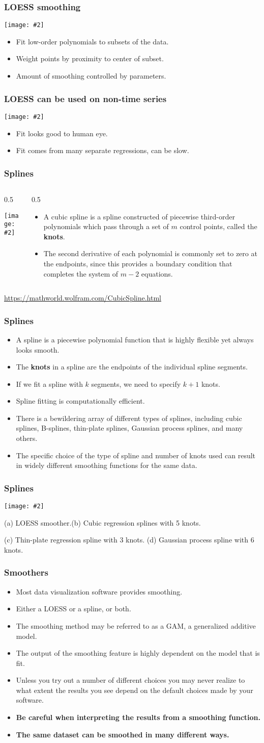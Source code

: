 \documentclass{beamer}
\newcommand{\bi}{\begin{itemize}}
\newcommand{\li}{\item}
\newcommand{\ei}{\end{itemize}}
\newcommand{\fig}[2]{\centerline{\texttt{[image: \#2]}}}
\newcommand{\bfr}[1]{\begin{frame}[fragile]\frametitle{{ #1 }}}
\newcommand{\cola}[1]{\begin{columns}\begin{column}{#1\textwidth}}
\newcommand{\colb}[1]{\end{column}\begin{column}{#1\textwidth}}
\newcommand{\colc}{\end{column}\end{columns}}
\begin{document}
\bfr{LOESS smoothing}
\fig{1}{dow-jones-loess-1.png}
\bi
\li Fit low-order polynomials to subsets of the data.
\li Weight points by proximity to center of subset.
\li Amount of smoothing controlled by parameters.
\ei
\end{frame}

\bfr{LOESS can be used on non-time series}
\fig{.8}{tank-capacity-loess-1.png}
\bi
\li Fit looks good to human eye.
\li Fit comes from many separate regressions, can be slow.
\ei
\end{frame}

\bfr{Splines}
\cola{0.5}
\fig{1}{CubicSpline_700.png}
\colb{0.5}
\bi
\li
A cubic spline is a spline constructed of piecewise third-order polynomials which pass through a set of $m$ control points, called the {\bf knots}.
\li The second derivative of each polynomial is commonly set to zero at the endpoints, since this provides a boundary condition that completes the system of $m-2$ equations. 
\ei
\colc
\vfill
\tiny
\url{https://mathworld.wolfram.com/CubicSpline.html}
\end{frame}

\bfr{Splines}
\bi
\li  A spline is a piecewise polynomial function that is highly flexible yet always looks smooth.
\li The {\bf knots} in a spline are the endpoints of the individual spline segments.
\li If we fit a spline with $k$ segments, we need to specify $k+1$ knots.
\li Spline fitting is computationally efficient. 
\li There is a bewildering array of different types of splines, including
cubic splines, B-splines,  thin-plate splines,  Gaussian process splines, and many others. 
\li The specific choice of the type of spline and number of knots used can result in widely different smoothing functions for the same data.
\ei
\end{frame}



\bfr{Splines}
\fig{.8}{tank-capacity-smoothers-1.png}
\scriptsize
(a)  LOESS smoother.\hfill (b) Cubic regression splines with 5 knots.

(c) Thin-plate regression spline with 3 knots. \hfill (d) Gaussian process spline with 6 knots.

\end{frame}

\bfr{Smoothers}
\bi
\li Most data visualization software provides smoothing.
\li Either a  LOESS or a  spline, or both.
\li The smoothing method may be referred to as a GAM, a generalized additive model.
\li The output of the smoothing feature is highly dependent on the model that is fit. 
\li Unless you try out a number of different choices you may never realize to what extent the results you see depend on the  default choices made by your  software.
\li\bf
Be careful when interpreting the results from a smoothing function.
\li\bf The same dataset can be smoothed in many different ways.
\ei
\end{frame}
\end{document}
